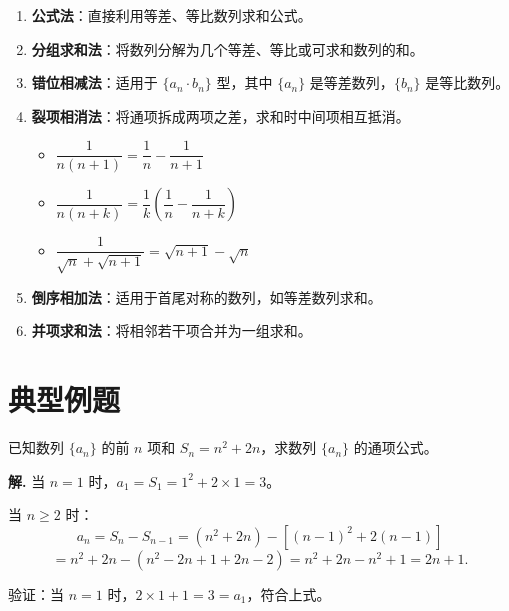 \documentclass[11pt]{ctexrep}
\begin{document}
\begin{property}[数列求和的常用方法]
    \begin{enumerate}
        \item \textbf{公式法}：直接利用等差、等比数列求和公式。
        
        \item \textbf{分组求和法}：将数列分解为几个等差、等比或可求和数列的和。
        
        \item \textbf{错位相减法}：适用于 $\{a_n \cdot b_n\}$ 型，其中 $\{a_n\}$ 是等差数列，$\{b_n\}$ 是等比数列。
        
        \item \textbf{裂项相消法}：将通项拆成两项之差，求和时中间项相互抵消。
        \begin{itemize}
            \item $\dfrac{1}{n(n+1)} = \dfrac{1}{n} - \dfrac{1}{n+1}$
            \item $\dfrac{1}{n(n+k)} = \dfrac{1}{k}\left(\dfrac{1}{n} - \dfrac{1}{n+k}\right)$
            \item $\dfrac{1}{\sqrt{n} + \sqrt{n+1}} = \sqrt{n+1} - \sqrt{n}$
        \end{itemize}
        
        \item \textbf{倒序相加法}：适用于首尾对称的数列，如等差数列求和。
        
        \item \textbf{并项求和法}：将相邻若干项合并为一组求和。
    \end{enumerate}
\end{property}

\section*{典型例题}

\begin{example}[由 $S_n$ 求 $a_n$]
    已知数列 $\{a_n\}$ 的前 $n$ 项和 $S_n = n^2 + 2n$，求数列 $\{a_n\}$ 的通项公式。
\end{example}

\textbf{解.} 当 $n = 1$ 时，$a_1 = S_1 = 1^2 + 2 \times 1 = 3$。

当 $n \geq 2$ 时：
\[
    a_n = S_n - S_{n-1} = (n^2 + 2n) - [(n-1)^2 + 2(n-1)]
\]
\[
    = n^2 + 2n - (n^2 - 2n + 1 + 2n - 2) = n^2 + 2n - n^2 + 1 = 2n + 1.
\]

验证：当 $n = 1$ 时，$2 \times 1 + 1 = 3 = a_1$，符合上式。
\end{document}

